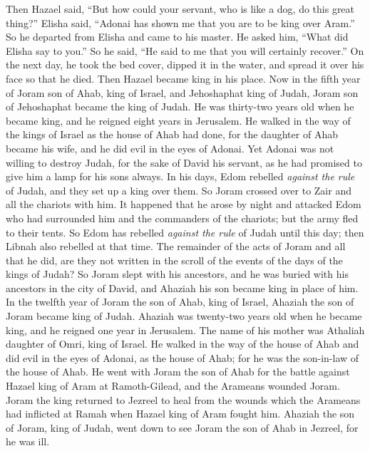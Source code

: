 \begin{biblechapter}
\verse Then Hazael said, “But how could your servant, who is like a dog, do this great thing?” Elisha said, “Adonai has shown me that you are to be king over Aram.”
\verse So he departed from Elisha and came to his master. He asked him, “What did Elisha say to you.” So he said, “He said to me that you will certainly recover.”
\verse On the next day, he took the bed cover, dipped it in the water, and spread it over his face so that he died. Then Hazael became king in his place.
 Now in the fifth year of Joram son of Ahab, king of Israel, and Jehoshaphat king of Judah, Joram son of Jehoshaphat became the king of Judah.
\verse He was thirty-two years old when he became king, and he reigned eight years in Jerusalem.
\verse He walked in the way of the kings of Israel as the house of Ahab had done, for the daughter of Ahab became his wife, and he did evil in the eyes of Adonai.
\verse Yet Adonai was not willing to destroy Judah, for the sake of David his servant, as he had promised to give him a lamp for his sons always.
\verse In his days, Edom rebelled \textit{against the rule} of Judah, and they set up a king over them.
\verse So Joram crossed over to Zair and all the chariots with him. It happened that he arose by night and attacked Edom who had surrounded him and the commanders of the chariots; but the army fled to their tents.
\verse So Edom has rebelled \textit{against the rule} of Judah until this day; then Libnah also rebelled at that time.
\verse The remainder of the acts of Joram and all that he did, are they not written in the scroll of the events of the days of the kings of Judah?
\verse So Joram slept with his ancestors, and he was buried with his ancestors in the city of David, and Ahaziah his son became king in place of him.
 In the twelfth year of Joram the son of Ahab, king of Israel, Ahaziah the son of Joram became king of Judah.
\verse Ahaziah was twenty-two years old when he became king, and he reigned one year in Jerusalem. The name of his mother was Athaliah daughter of Omri, king of Israel.
\verse He walked in the way of the house of Ahab and did evil in the eyes of Adonai, as the house of Ahab; for he was the son-in-law of the house of Ahab.
\verse He went with Joram the son of Ahab for the battle against Hazael king of Aram at Ramoth-Gilead, and the Arameans wounded Joram.
\verse Joram the king returned to Jezreel to heal from the wounds which the Arameans had inflicted at Ramah when Hazael king of Aram fought him. Ahaziah the son of Joram, king of Judah, went down to see Joram the son of Ahab in Jezreel, for he was ill.
\end{biblechapter}

